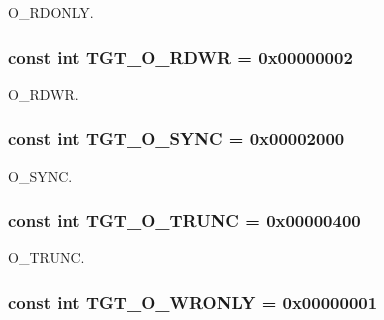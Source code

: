 O\_\-RDONLY. \hypertarget{classSparcLinux_ac6fa9ecf5d2f3314f197698f1099e2ac}{
\subsubsection[{TGT\_\-O\_\-RDWR}]{\setlength{\rightskip}{0pt plus 5cm}const int {\bf TGT\_\-O\_\-RDWR} = 0x00000002}}
\label{classSparcLinux_ac6fa9ecf5d2f3314f197698f1099e2ac}


O\_\-RDWR. \hypertarget{classSparcLinux_abf43ab05d2a5b6b8113952160d8565db}{
\subsubsection[{TGT\_\-O\_\-SYNC}]{\setlength{\rightskip}{0pt plus 5cm}const int {\bf TGT\_\-O\_\-SYNC} = 0x00002000}}
\label{classSparcLinux_abf43ab05d2a5b6b8113952160d8565db}


O\_\-SYNC. \hypertarget{classSparcLinux_a4f892ee6e1424a2becd859b0bef1f18b}{
\subsubsection[{TGT\_\-O\_\-TRUNC}]{\setlength{\rightskip}{0pt plus 5cm}const int {\bf TGT\_\-O\_\-TRUNC} = 0x00000400}}
\label{classSparcLinux_a4f892ee6e1424a2becd859b0bef1f18b}


O\_\-TRUNC. \hypertarget{classSparcLinux_a6156c069cefe05ce3cce033b2e0c2de2}{
\subsubsection[{TGT\_\-O\_\-WRONLY}]{\setlength{\rightskip}{0pt plus 5cm}const int {\bf TGT\_\-O\_\-WRONLY} = 0x00000001}}
\label{classSparcLinux_a6156c069cefe05ce3cce033b2e0c2de2}


